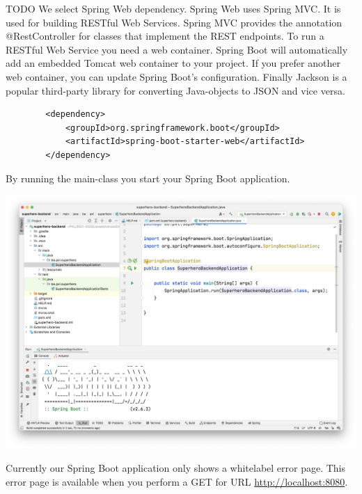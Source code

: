 TODO We select Spring Web dependency. Spring Web uses Spring MVC. It is used for building RESTful Web Services. Spring MVC provides the annotation @RestController for classes that implement the REST endpoints.
To run a RESTful Web Service you need a web container. Spring Boot will automatically add an embedded Tomcat web container to your project. If you prefer another web container, you can update Spring Boot's configuration.
Finally Jackson is a popular third-party library for converting Java-objects to JSON and vice versa.

\begin{lstlisting}
		<dependency>
			<groupId>org.springframework.boot</groupId>
			<artifactId>spring-boot-starter-web</artifactId>
		</dependency>
		\end{lstlisting}
		
		
By running the main-class you start your Spring Boot application. 

\includegraphics[width=\textwidth]{./images/chapter2/first-run.png}

Currently our Spring Boot application only shows a whitelabel error page. This error page is available when you perform a GET for URL \url{http://localhost:8080}.


